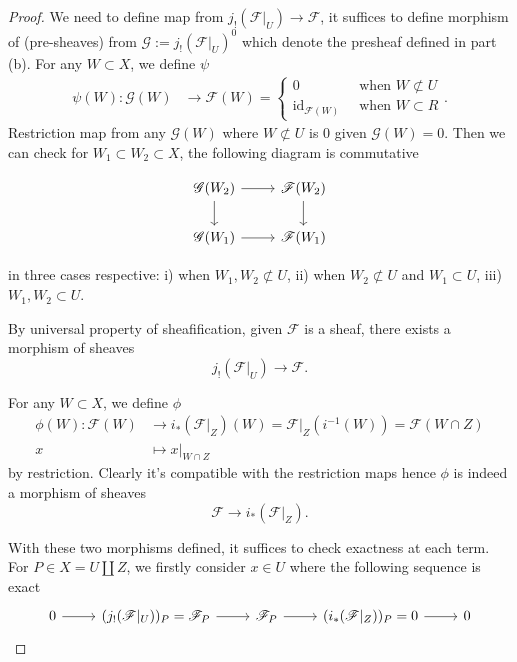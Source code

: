 \begin{proof}
We need to define map from $j_!(\mathscr F\vert_U)\to \mathscr F$, it suffices to define morphism of (pre-sheaves) from $\mathscr G:=j_!(\mathscr F\vert_U)^0$ which denote the presheaf defined in part (b). For any $W\subset X$, we define $\psi$
\begin{align*}
    \psi(W):\mathscr G(W) &\to \mathscr F(W) = \begin{cases}
        0 &~ \text{ when } W\not\subset U\\
        \operatorname{id}_{\mathscr F(W)} &~ \text{ when } W\subset R
    \end{cases}.
\end{align*} Restriction map from any $\mathscr G(W)$ where $W\not\subset U$ is $0$ given $\mathscr G(W)=0$. Then we can check for $W_1\subset W_2\subset X$, the following diagram is commutative

\[\begin{tikzcd}
	{\mathscr G(W_2)} & {\mathscr F(W_2)} \\
	{\mathscr G(W_1)} & {\mathscr F(W_1)}
	\arrow[from=1-1, to=1-2]
	\arrow[from=1-1, to=2-1]
	\arrow[from=1-2, to=2-2]
	\arrow[from=2-1, to=2-2]
\end{tikzcd}\]

in three cases respective: i) when $W_1,W_2\not\subset U$, ii) when $W_2\not\subset U$ and $W_1\subset U$, iii) $W_1,W_2\subset U$.

By universal property of sheafification, given $\mathscr F$ is a sheaf, there exists a morphism of sheaves \[j_!(\mathscr F\vert_U)\to\mathscr F.\]

For any $W\subset X$, we define $\phi$ 
\begin{align*}
    \phi(W):\mathscr F(W) &\to i_{\ast}(\mathscr F\vert_Z)(W)=\mathscr F\vert_Z(i^{-1}(W))=\mathscr F(W\cap Z) \\
    x &\mapsto x\vert_{W\cap Z}
\end{align*}by restriction. Clearly it's compatible with the restriction maps hence $\phi$ is indeed a morphism of sheaves
\[\mathscr F\to i_{\ast}(\mathscr F\vert_Z).\] 

With these two morphisms defined, it suffices to check exactness at each term. 
For $P\in X=U\amalg Z$, we firstly consider $x\in U$ where the following sequence is exact 
\[\begin{tikzcd}
	0 & {(j_!(\mathscr F\vert_U))_P=\mathscr F_P} & {\mathscr F_P} & {(i_{\ast}(\mathscr F\vert_Z))_P=0} & 0
	\arrow[from=1-1, to=1-2]
	\arrow[from=1-2, to=1-3]
	\arrow[from=1-3, to=1-4]
	\arrow[from=1-4, to=1-5]
\end{tikzcd}\]


\end{proof}
